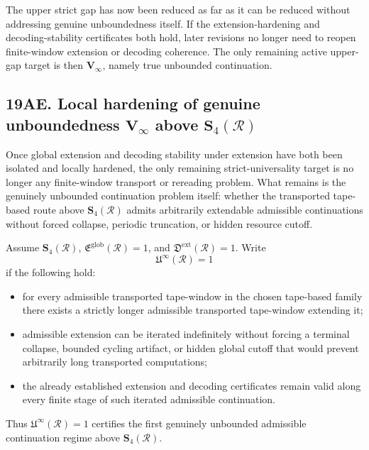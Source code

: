 \begin{corollary}
The upper strict gap has now been reduced as far as it can be reduced without addressing genuine unboundedness itself. If the extension-hardening and decoding-stability certificates both hold, later revisions no longer need to reopen finite-window extension or decoding coherence. The only remaining active upper-gap target is then \(\mathbf V_\infty\), namely true unbounded continuation.
\end{corollary}


\subsection*{19AE. Local hardening of genuine unboundedness \(\mathbf V_\infty\) above \(\mathbf S_4(\mathcal R)\)}
Once global extension and decoding stability under extension have both been isolated and locally hardened, the only remaining strict-universality target is no longer any finite-window transport or rereading problem. What remains is the genuinely unbounded continuation problem itself: whether the transported tape-based route above \(\mathbf S_4(\mathcal R)\) admits arbitrarily extendable admissible continuations without forced collapse, periodic truncation, or hidden resource cutoff.

\begin{definition}
Assume \(\mathbf S_4(\mathcal R)\), \(\mathfrak E^{\mathrm{glob}}(\mathcal R)=1\), and \(\mathfrak D^{\mathrm{ext}}(\mathcal R)=1\).
Write
\[
\mathfrak U^{\infty}(\mathcal R)=1
\]
if the following hold:
\begin{itemize}[leftmargin=2em]
 \item for every admissible transported tape-window in the chosen tape-based family there exists a strictly longer admissible transported tape-window extending it;
 \item admissible extension can be iterated indefinitely without forcing a terminal collapse, bounded cycling artifact, or hidden global cutoff that would prevent arbitrarily long transported computations;
 \item the already established extension and decoding certificates remain valid along every finite stage of such iterated admissible continuation.
\end{itemize}
Thus \(\mathfrak U^{\infty}(\mathcal R)=1\) certifies the first genuinely unbounded admissible continuation regime above \(\mathbf S_4(\mathcal R)\).
\end{definition}

